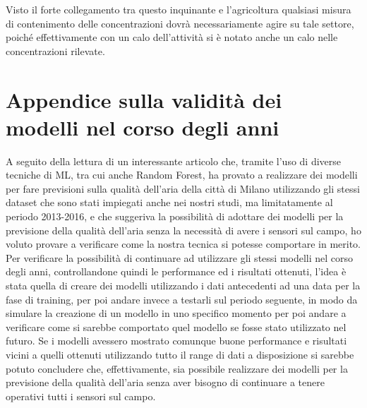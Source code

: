 \documentclass[a4paper]{report}
\begin{document}
Visto il forte collegamento tra questo inquinante e l'agricoltura qualsiasi misura di contenimento delle concentrazioni dovrà necessariamente agire su tale settore, poiché effettivamente con un calo dell'attività si è notato anche un calo nelle concentrazioni rilevate.

\chapter{Appendice sulla validità dei modelli nel corso degli anni}
A seguito della lettura di un interessante articolo \cite{app10134587} che, tramite l'uso di diverse tecniche di ML, tra cui anche Random Forest, ha provato a realizzare dei modelli per fare previsioni sulla qualità dell'aria della città di Milano utilizzando gli stessi dataset che sono stati impiegati anche nei nostri studi, ma limitatamente al periodo 2013-2016, e che suggeriva la possibilità di adottare dei modelli per la previsione della qualità dell'aria senza la necessità di avere i sensori sul campo, ho voluto provare a verificare come la nostra tecnica si potesse comportare in merito.
Per verificare la possibilità di continuare ad utilizzare gli stessi modelli nel corso degli anni, controllandone quindi le performance ed i risultati ottenuti, l'idea è stata quella di creare dei modelli utilizzando i dati antecedenti ad una data per la fase di training, per poi andare invece a testarli sul periodo seguente, in modo da simulare la creazione di un modello in uno specifico momento per poi andare a verificare come si sarebbe comportato quel modello se fosse stato utilizzato nel futuro. Se i modelli avessero mostrato comunque buone performance e risultati vicini a quelli ottenuti utilizzando tutto il range di dati a disposizione si sarebbe potuto concludere che, effettivamente, sia possibile realizzare dei modelli per la previsione della qualità dell'aria senza aver bisogno di continuare a tenere operativi tutti i sensori sul campo.  
\end{document}
